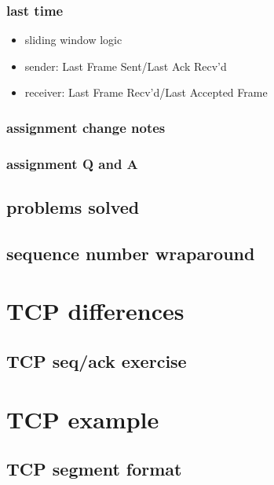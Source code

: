 \date{}
\title{}
\date{}
\usepackage{pgfplots}
\pgfplotsset{compat=1.16}

\begin{frame}
    \titlepage
\end{frame}

\begin{frame}
\frametitle{last time}
\begin{itemize}
\item sliding window logic
\item sender: Last Frame Sent/Last Ack Recv'd
\item receiver: Last Frame Recv'd/Last Accepted Frame
\end{itemize}
\end{frame}

\begin{frame}
\frametitle{assignment change notes}
\end{frame}

\begin{frame}
\frametitle{assignment Q and A}
\end{frame}

\subsection{problems solved}


\subsection{sequence number wraparound}


\section{TCP differences}


\subsection{TCP seq/ack exercise}


\section{TCP example}

\subsection{TCP segment format}



